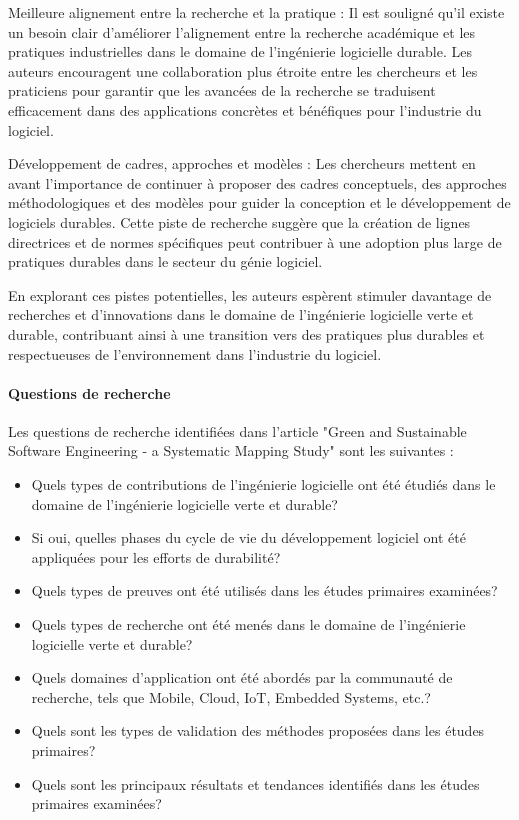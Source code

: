 Meilleure alignement entre la recherche et la pratique : Il est souligné qu'il existe un besoin clair d'améliorer l'alignement entre la recherche académique et les pratiques industrielles dans le domaine de l'ingénierie logicielle durable. Les auteurs encouragent une collaboration plus étroite entre les chercheurs et les praticiens pour garantir que les avancées de la recherche se traduisent efficacement dans des applications concrètes et bénéfiques pour l'industrie du logiciel.

Développement de cadres, approches et modèles : Les chercheurs mettent en avant l'importance de continuer à proposer des cadres conceptuels, des approches méthodologiques et des modèles pour guider la conception et le développement de logiciels durables. Cette piste de recherche suggère que la création de lignes directrices et de normes spécifiques peut contribuer à une adoption plus large de pratiques durables dans le secteur du génie logiciel.

En explorant ces pistes potentielles, les auteurs espèrent stimuler davantage de recherches et d'innovations dans le domaine de l'ingénierie logicielle verte et durable, contribuant ainsi à une transition vers des pratiques plus durables et respectueuses de l'environnement dans l'industrie du logiciel.

\paragraph{Questions de recherche}
Les questions de recherche identifiées dans l'article "Green and Sustainable Software Engineering - a Systematic Mapping Study" sont les suivantes :

\begin{itemize}
  \item Quels types de contributions de l'ingénierie logicielle ont été étudiés dans le domaine de l'ingénierie logicielle verte et durable?
  \item Si oui, quelles phases du cycle de vie du développement logiciel ont été appliquées pour les efforts de durabilité?
  \item Quels types de preuves ont été utilisés dans les études primaires examinées?
  \item Quels types de recherche ont été menés dans le domaine de l'ingénierie logicielle verte et durable?
  \item Quels domaines d'application ont été abordés par la communauté de recherche, tels que Mobile, Cloud, IoT, Embedded Systems, etc.?
  \item Quels sont les types de validation des méthodes proposées dans les études primaires?
  \item Quels sont les principaux résultats et tendances identifiés dans les études primaires examinées?
\end{itemize}

